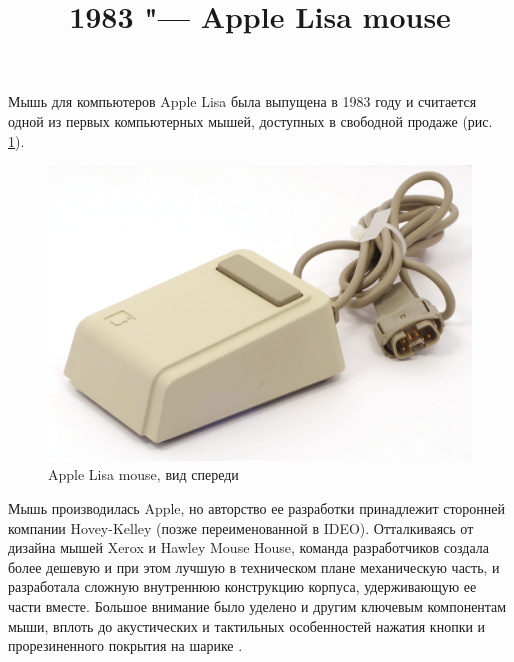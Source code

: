 \documentclass[11pt, a4paper]{article}
\begin{document}
\title{1983 "--- Apple Lisa mouse}
\date{}
\maketitle
{}
Мышь для компьютеров Apple Lisa была выпущена в 1983 году \cite{mouses} и считается одной из первых компьютерных мышей, доступных в свободной продаже (рис. \ref{fig:AppleLisaPic}).

\begin{figure}[h]
   \centering
    \includegraphics[scale=0.5]{1983_apple_lisa_mouse/applenorm_30.jpg}
    \caption{Apple Lisa mouse, вид спереди}
    \label{fig:AppleLisaPic}
\end{figure}

Мышь производилась Apple, но авторство ее разработки принадлежит сторонней компании Hovey-Kelley (позже переименованной в IDEO). Отталкиваясь от дизайна мышей Xerox и Hawley Mouse House, команда разработчиков создала более дешевую и при этом лучшую в техническом плане механическую часть, и разработала сложную внутреннюю конструкцию корпуса, удерживающую ее части вместе. Большое внимание было уделено и другим ключевым компонентам мыши, вплоть до акустических и тактильных особенностей нажатия кнопки и прорезиненного покрытия на шарике \cite{ideo}.
\end{document}
